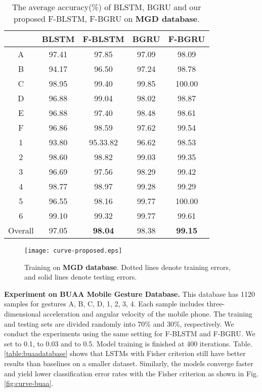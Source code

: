 \documentclass[review]{elsarticle}
\begin{document}
\begin{table*}[htp]
	\centering
	\caption{The average accuracy(\%) of BLSTM, BGRU and our proposed F-BLSTM, F-BGRU on \textbf{{MGD} database}.}
	\label{table:ourdatabase}
	\vspace*{6pt}
	\begin{tabular}{||c||c|c||c|c||}
		\hline
		\diagbox{\textbf{Gesture}}{\textbf{Method}} & BLSTM & F-BLSTM & BGRU & F-BGRU\\
		\hline
		A & 97.41 & 97.85 & 97.09 & 98.09 \\ B & 94.17 & 96.50 & 97.24 & 98.78 \\ C & 98.95 & 99.40 & 99.85 & 100.00 \\ D & 96.88 & 99.04 & 98.02 & 98.87 \\ E & 96.88 & 97.40 & 98.48 & 98.61 \\ F & 96.86 & 98.59 & 97.62 & 99.54 \\ 1 & 93.80 & 95.33.82 & 96.62 & 98.53 \\ 2 & 98.60 & 98.82 & 99.03 & 99.35 \\ 3 & 96.69 & 97.56 & 98.29 & 99.42 \\ 4 & 98.77 & 98.97 & 99.28 & 99.29 \\ 5 & 96.55 & 98.16 & 99.77 & 100.00 \\ 6 & 99.10 & 99.32 & 99.77 & 99.61 \\ \hline
		Overall & 97.05 & \textbf{98.04} & 98.38 & \textbf{99.15} \\ \hline
	\end{tabular}
\end{table*}

\begin{figure*}[htbp]
	\normalsize
	\centering
	\texttt{[image: curve-proposed.eps]}
	\caption{Training on \textbf{{MGD} database}. Dotted lines denote training errors, and solid lines denote testing errors. }
	\label{fig:curve-proposed}
	\vspace*{4pt}
\end{figure*}

\textbf{Experiment on BUAA Mobile Gesture Database\;\cite{xie2016ccbr}.}
This database has 1120 samples for gestures A, B, C, D, 1, 2, 3, 4. Each sample includes three-dimensional acceleration and angular velocity of the mobile phone. The training and testing sets are divided randomly into 70\% and 30\%, respectively. We conduct the experiments using the same setting for F-BLSTM and F-BGRU. We set  to 0.1,  to 0.03 and  to 0.5. Model training is finished at 400 iterations. Table.\;\ref{table:buaadatabase} shows that LSTMs with Fisher criterion still have better results than baselines on a smaller dataset. Similarly, the models converge faster and yield lower classification error rates with the Fisher criterion as shown in Fig.\;\ref{fig:curve-buaa}.
\end{document}
